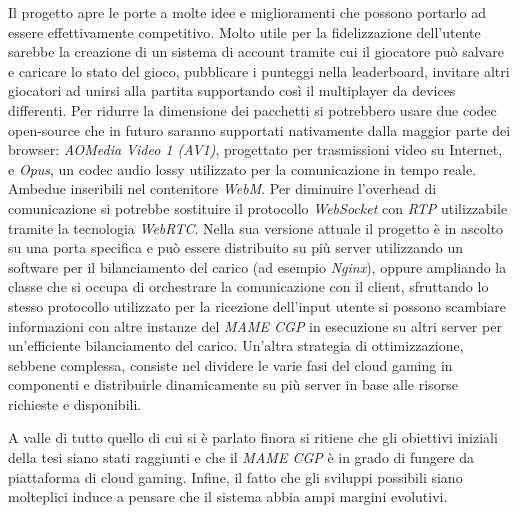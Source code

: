 Il progetto apre le porte a molte idee e miglioramenti che possono portarlo ad essere effettivamente competitivo. Molto utile per la fidelizzazione dell'utente sarebbe la creazione di un sistema di account tramite cui il giocatore può salvare e caricare lo stato del gioco, pubblicare i punteggi nella leaderboard, invitare altri giocatori ad unirsi alla partita supportando così il multiplayer da devices differenti. Per ridurre la dimensione dei pacchetti si potrebbero usare due codec open-source che in futuro saranno supportati nativamente dalla maggior parte dei browser: \textit{AOMedia Video 1 (AV1)}, progettato per trasmissioni video su Internet, e \textit{Opus}, un codec audio lossy utilizzato per la comunicazione in tempo reale. Ambedue inseribili nel contenitore \textit{WebM}. Per diminuire l'overhead di comunicazione si potrebbe sostituire il protocollo \textit{WebSocket} con \textit{RTP} utilizzabile tramite la tecnologia \textit{WebRTC}. Nella sua versione attuale il progetto è in ascolto su una porta specifica e può essere distribuito su più server utilizzando un software per il bilanciamento del carico (ad esempio \textit{Nginx}), oppure ampliando la classe che si occupa di orchestrare la comunicazione con il client, sfruttando lo stesso protocollo utilizzato per la ricezione dell'input utente si possono scambiare informazioni con altre instanze del \textit{MAME CGP} in esecuzione su altri server per un'efficiente bilanciamento del carico. Un'altra strategia di ottimizzazione, sebbene complessa, consiste nel dividere le varie fasi del cloud gaming in componenti e distribuirle dinamicamente su più server in base alle risorse richieste e disponibili.

A valle di tutto quello di cui si è parlato finora si ritiene che gli obiettivi iniziali della tesi siano stati raggiunti e che il \textit{MAME CGP} è in grado di fungere da piattaforma di cloud gaming. Infine, il fatto che gli sviluppi possibili siano molteplici induce a pensare che il sistema abbia ampi margini evolutivi.